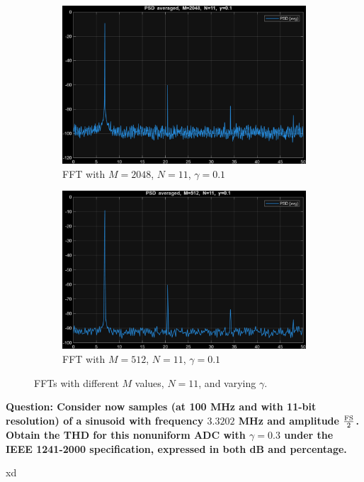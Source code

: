 \begin{figure}[H]
  \begin{subfigure}[t]{0.45\textwidth}
    \centering
    \includegraphics[width=\linewidth,height=0.28\textheight,keepaspectratio]{img/task5_5_3.png}
    \caption{FFT with $M=2048$, $N=11$, $\gamma=0.1$}
  \end{subfigure}\hfill
  \begin{subfigure}[t]{0.45\textwidth}
    \centering
    \includegraphics[width=\linewidth,height=0.28\textheight,keepaspectratio]{img/task5_5_6.png}
    \caption{FFT with $M=512$, $N=11$, $\gamma=0.1$}
  \end{subfigure}

  \caption{FFTs with different $M$ values, $N=11$, and varying $\gamma$.}
  \label{fig:task5_5}
\end{figure}

\vspace{1cm}
\textbf{Question: Consider now samples (at 100 MHz and with 11-bit resolution) of a sinusoid with frequency $3.3202$ MHz and amplitude $\frac{\rm FS}{2}$. Obtain the THD for this nonuniform ADC with $\gamma = 0.3$ under the IEEE 1241-2000 specification, expressed in both dB and percentage.
}
\vspace{0.5cm}

xd

